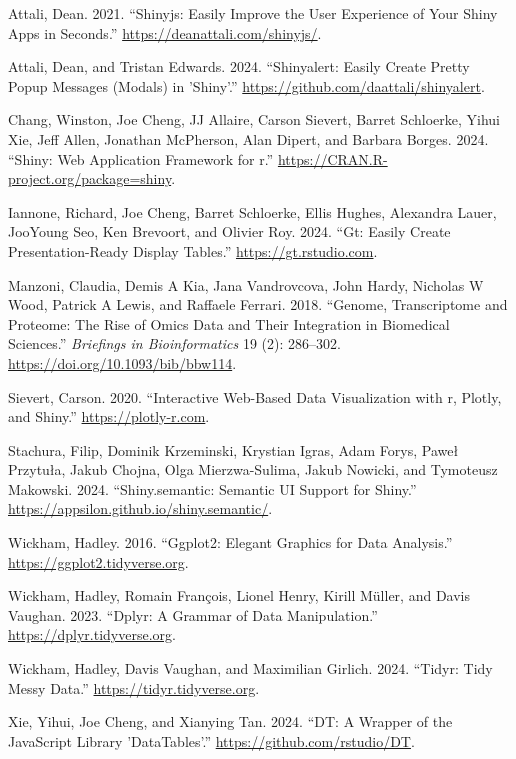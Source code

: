 \documentclass[
]{article}
\newlength{\cslhangindent}
\newenvironment{CSLReferences}[2] %
 {\begin{list}{}{%
  \setlength{\itemindent}{0pt}
  \setlength{\leftmargin}{0pt}
  \setlength{\parsep}{0pt}
  \ifodd #1
   \setlength{\leftmargin}{\cslhangindent}
   \setlength{\itemindent}{-1\cslhangindent}
  \fi
  \setlength{\itemsep}{#2\baselineskip}}}
 {\end{list}}
\begin{document}
\label{refs}
\begin{CSLReferences}{1}{0}
Attali, Dean. 2021. {``Shinyjs: Easily Improve the User Experience of
Your Shiny Apps in Seconds.''} \url{https://deanattali.com/shinyjs/}.

Attali, Dean, and Tristan Edwards. 2024. {``Shinyalert: Easily Create
Pretty Popup Messages (Modals) in 'Shiny'.''}
\url{https://github.com/daattali/shinyalert}.

Chang, Winston, Joe Cheng, JJ Allaire, Carson Sievert, Barret Schloerke,
Yihui Xie, Jeff Allen, Jonathan McPherson, Alan Dipert, and Barbara
Borges. 2024. {``Shiny: Web Application Framework for r.''}
\url{https://CRAN.R-project.org/package=shiny}.

Iannone, Richard, Joe Cheng, Barret Schloerke, Ellis Hughes, Alexandra
Lauer, JooYoung Seo, Ken Brevoort, and Olivier Roy. 2024. {``Gt: Easily
Create Presentation-Ready Display Tables.''}
\url{https://gt.rstudio.com}.

Manzoni, Claudia, Demis A Kia, Jana Vandrovcova, John Hardy, Nicholas W
Wood, Patrick A Lewis, and Raffaele Ferrari. 2018. {``Genome,
Transcriptome and Proteome: The Rise of Omics Data and Their Integration
in Biomedical Sciences.''} \emph{Briefings in Bioinformatics} 19 (2):
286--302. \url{https://doi.org/10.1093/bib/bbw114}.

Sievert, Carson. 2020. {``Interactive Web-Based Data Visualization with
r, Plotly, and Shiny.''} \url{https://plotly-r.com}.

Stachura, Filip, Dominik Krzeminski, Krystian Igras, Adam Forys, Paweł
Przytuła, Jakub Chojna, Olga Mierzwa-Sulima, Jakub Nowicki, and
Tymoteusz Makowski. 2024. {``Shiny.semantic: Semantic UI Support for
Shiny.''} \url{https://appsilon.github.io/shiny.semantic/}.

Wickham, Hadley. 2016. {``Ggplot2: Elegant Graphics for Data
Analysis.''} \url{https://ggplot2.tidyverse.org}.

Wickham, Hadley, Romain François, Lionel Henry, Kirill Müller, and Davis
Vaughan. 2023. {``Dplyr: A Grammar of Data Manipulation.''}
\url{https://dplyr.tidyverse.org}.

Wickham, Hadley, Davis Vaughan, and Maximilian Girlich. 2024. {``Tidyr:
Tidy Messy Data.''} \url{https://tidyr.tidyverse.org}.

Xie, Yihui, Joe Cheng, and Xianying Tan. 2024. {``DT: A Wrapper of the
JavaScript Library 'DataTables'.''} \url{https://github.com/rstudio/DT}.

\end{CSLReferences}
\end{document}
